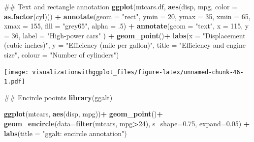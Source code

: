\documentclass[]{krantz}
\makeatletter
\newenvironment{Shaded}{\begin{snugshade}}{\end{snugshade}}
\newcommand{\KeywordTok}[1]{\textcolor[rgb]{0.13,0.29,0.53}{\textbf{#1}}}
\newcommand{\DataTypeTok}[1]{\textcolor[rgb]{0.13,0.29,0.53}{#1}}
\newcommand{\DecValTok}[1]{\textcolor[rgb]{0.00,0.00,0.81}{#1}}
\newcommand{\FloatTok}[1]{\textcolor[rgb]{0.00,0.00,0.81}{#1}}
\newcommand{\StringTok}[1]{\textcolor[rgb]{0.31,0.60,0.02}{#1}}
\newcommand{\OperatorTok}[1]{\textcolor[rgb]{0.81,0.36,0.00}{\textbf{#1}}}
\newcommand{\NormalTok}[1]{#1}
\newenvironment{kframe}{%
\medskip{}
\setlength{\fboxsep}{.8em}
 \def\at@end@of@kframe{}%
 \ifinner\ifhmode%
  \def\at@end@of@kframe{\end{minipage}}%
  \begin{minipage}{\columnwidth}%
 \fi\fi%
 \def\FrameCommand##1{\hskip\@totalleftmargin \hskip-\fboxsep
 \colorbox{shadecolor}{##1}\hskip-\fboxsep
     \hskip-\linewidth \hskip-\@totalleftmargin \hskip\columnwidth}%
 \MakeFramed {\advance\hsize-\width
   \@totalleftmargin\z@ \linewidth\hsize
   \@setminipage}}%
 {\par\unskip\endMakeFramed%
 \at@end@of@kframe}
\renewenvironment{Shaded}{\begin{kframe}}{\end{kframe}}
\theoremstyle{definition}
\theoremstyle{definition}
\theoremstyle{definition}
\theoremstyle{remark}
\makeatother
\begin{document}
\begin{Shaded}
\begin{Highlighting}[]
\NormalTok{## Text and rectangle annotation }
\KeywordTok{ggplot}\NormalTok{(mtcars.df, }\KeywordTok{aes}\NormalTok{(disp,  mpg, }\DataTypeTok{color =} \KeywordTok{as.factor}\NormalTok{(cyl))) }\OperatorTok{+}\StringTok{ }
\StringTok{  }\KeywordTok{annotate}\NormalTok{(}\DataTypeTok{geom =} \StringTok{"rect"}\NormalTok{, }\DataTypeTok{ymin =} \DecValTok{20}\NormalTok{, }\DataTypeTok{ymax =} \DecValTok{35}\NormalTok{, }\DataTypeTok{xmin =} \DecValTok{65}\NormalTok{, }\DataTypeTok{xmax =} \DecValTok{155}\NormalTok{, }\DataTypeTok{fill =} \StringTok{"grey65"}\NormalTok{, }\DataTypeTok{alpha =}\NormalTok{ .}\DecValTok{5}\NormalTok{) }\OperatorTok{+}
\StringTok{  }\KeywordTok{annotate}\NormalTok{(}\DataTypeTok{geom =} \StringTok{"text"}\NormalTok{, }\DataTypeTok{x =} \DecValTok{115}\NormalTok{, }\DataTypeTok{y =} \DecValTok{36}\NormalTok{, }\DataTypeTok{label =} \StringTok{"High-power cars"}\NormalTok{ ) }\OperatorTok{+}
\StringTok{  }\KeywordTok{geom_point}\NormalTok{()}\OperatorTok{+}
\StringTok{  }\KeywordTok{labs}\NormalTok{(}\DataTypeTok{x =} \StringTok{"Displacement (cubic inches)"}\NormalTok{, }\DataTypeTok{y =} \StringTok{"Efficiency (mile per gallon)"}\NormalTok{, }
       \DataTypeTok{title =} \StringTok{"Efficiency and engine size"}\NormalTok{, }\DataTypeTok{colour =} \StringTok{"Number of cylinders"}\NormalTok{)}
\end{Highlighting}
\end{Shaded}

\texttt{[image: visualizationwithggplot\_files/figure-latex/unnamed-chunk-46-1.pdf]}

\begin{Shaded}
\begin{Highlighting}[]
\NormalTok{## Encircle pooints}
\KeywordTok{library}\NormalTok{(ggalt)}

 \KeywordTok{ggplot}\NormalTok{(mtcars, }\KeywordTok{aes}\NormalTok{(disp, mpg))}\OperatorTok{+}
\StringTok{    }\KeywordTok{geom_point}\NormalTok{()}\OperatorTok{+}
\StringTok{    }\KeywordTok{geom_encircle}\NormalTok{(}\DataTypeTok{data=}\KeywordTok{filter}\NormalTok{(mtcars, mpg}\OperatorTok{>}\DecValTok{24}\NormalTok{),}
                   \DataTypeTok{s_shape=}\FloatTok{0.75}\NormalTok{, }\DataTypeTok{expand=}\FloatTok{0.05}\NormalTok{) }\OperatorTok{+}
\StringTok{   }\KeywordTok{labs}\NormalTok{(}\DataTypeTok{title =} \StringTok{"ggalt: encircle annotation"}\NormalTok{)}
\end{Highlighting}
\end{Shaded}
\end{document}
